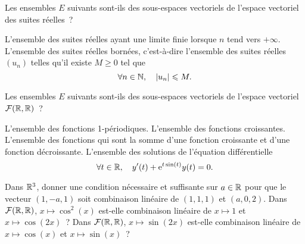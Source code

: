 \documentclass{magnolia}
\begin{document}

\begin{questions}
\question Les ensembles $E$ suivants sont-ils des sous-espaces vectoriels de l'espace vectoriel
	des suites réelles~?
\begin{questions}
\question L'ensemble des suites réelles ayant une limite finie lorsque $n$ tend vers
$+\infty$.
\question L'ensemble des suites réelles bornées, c'est-à-dire l'ensemble des suites
	réelles $(u_n)$ telles qu'il existe $M\geq 0$ tel que
	\[\forall n\in\mathbb{N},\quad \left|u_n\right|\leqslant M.\]
\end{questions}
\question Les ensembles $E$ suivants sont-ils des sous-espaces vectoriels de l'espace vectoriel $\mathcal{F}(\mathbb{R},\mathbb{R})$~?
\begin{questions}
\question L'ensemble des fonctions 1-périodiques.
\question L'ensemble des fonctions croissantes.
\question L'ensemble des fonctions qui sont la somme d'une fonction croissante et d'une fonction
  décroissante.
\question L'ensemble des solutions de l'équation différentielle
	\[\forall t\in\mathbb{R},\quad y'(t)+{\rm e}^{t \sin(t)}y(t)=0.\]
\end{questions}
\end{questions}


\begin{questions}
\question Dans $\mathbb{R}^3$, donner une condition nécessaire et suffisante sur $a\in\mathbb{R}$ pour
  que le vecteur $(1,-a,1)$ soit combinaison linéaire de $(1,1,1)$ et $(a,0,2)$.
\question Dans $\mathcal{F}(\mathbb{R},\mathbb{R})$, $x\mapsto \cos^2(x)$ est-elle combinaison linéaire
  de $x\mapsto 1$ et $x\mapsto \cos(2x)$~?
\question Dans $\mathcal{F}(\mathbb{R},\mathbb{R})$, $x\mapsto \sin(2x)$ est-elle combinaison linéaire
de $x\mapsto \cos(x)$ et $x\mapsto \sin(x)$~? 
\end{questions}
\end{document}
